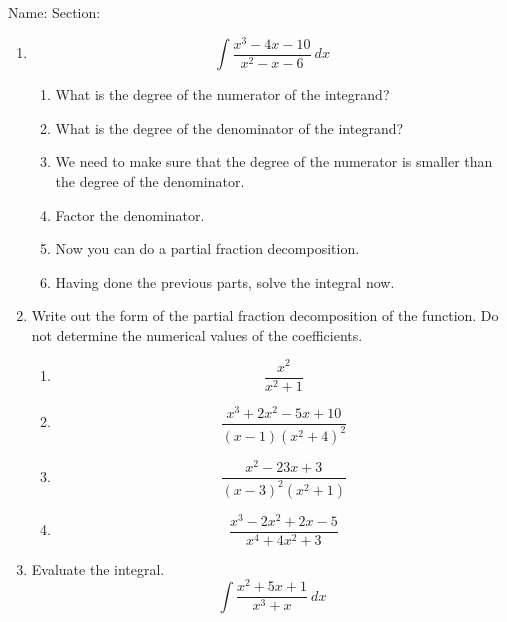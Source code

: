 \documentclass[12pt]{article}
\begin{document}
\noindent Name: \hspace{4in}Section:
\vspace{0.5cm}



\begin{enumerate}
\item \[\int \frac{x^3-4x-10}{x^2-x-6} \: dx\]
\begin{enumerate}
\item What is the degree of the numerator of the integrand?
\item What is the degree of the denominator of the integrand?
\item We need to make sure that the degree of the numerator is smaller than the degree of the denominator.

\vfill
\item Factor the denominator.\\
\item Now you can do a partial fraction decomposition.
\vfill 
\item Having done the previous parts, solve the integral now.
\vfill
\end{enumerate}
\newpage

\item Write out the form of the partial fraction decomposition of the function. Do not determine the numerical values of the coefficients.
\begin{enumerate}
\item \[\frac{x^2}{x^2+1}\]
\vfill

 

\item \[\frac{x^3+2x^2-5x+10}{(x-1)(x^2+4)^2} \]
\vfill
\item\[\frac{x^2-23x+3}{(x-3)^2(x^2+1)}\]


\vfill

\item \[\frac{x^3-2x^2+2x-5}{x^4+4x^2+3}\]
\vfill

\end{enumerate}
\newpage
\item Evaluate the integral.
\[\int \frac{x^2+5x+1}{x^3+x} \: dx\]
\end{enumerate}
\end{document}
